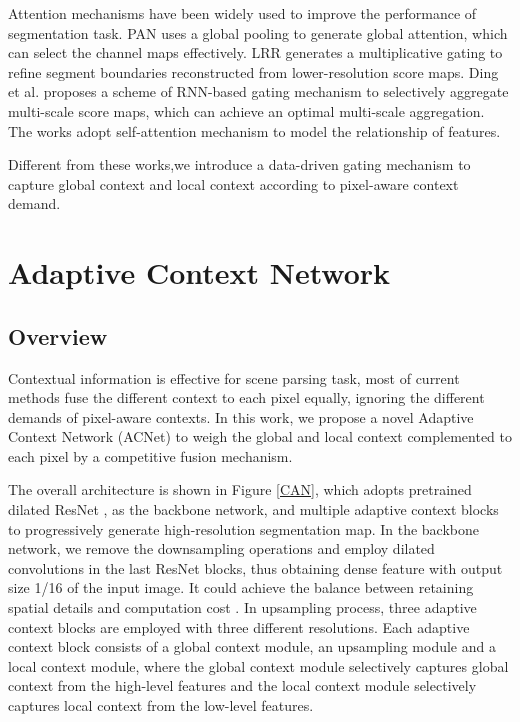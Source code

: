 \documentclass[10pt,twocolumn,letterpaper]{article}
\begin{document}
 Attention mechanisms have been widely used to  improve the performance of segmentation task. PAN \cite{li2018pyramid} uses a global pooling to generate global attention, which can select the channel maps effectively. LRR \cite{ghiasi2016laplacian}  generates a multiplicative gating to refine segment boundaries reconstructed from lower-resolution score maps.  Ding et al.\cite{ding2018context}  proposes a scheme of RNN-based gating mechanism  to selectively aggregate multi-scale score maps, which can achieve an optimal multi-scale aggregation. The works \cite{fu2018dual,yuan2018ocnet,huang2018ccnet} adopt self-attention mechanism to model the relationship of features.



Different from these works,we introduce a data-driven gating mechanism to capture global context and local context according to pixel-aware context demand.



\section{Adaptive Context Network}


\subsection{Overview}
Contextual information is effective for scene parsing task, most of current methods  fuse the different context  to each pixel equally, ignoring the different demands of  pixel-aware contexts.
In this work, we propose a novel Adaptive Context Network (ACNet) to weigh the global and local context complemented to each pixel by a competitive fusion mechanism.

The overall architecture is shown in Figure \ref{CAN}, which adopts pretrained dilated ResNet \cite{he2016deep}, as the backbone network, and  multiple adaptive context blocks to progressively generate high-resolution segmentation map.
In the backbone network, we  remove the  downsampling operations and employ dilated convolutions in the last ResNet blocks, thus obtaining  dense feature  with output size 1/16 of the input image. It could achieve the balance between retaining spatial details and  computation cost \cite{chen2018encoder}. 
In upsampling process, three adaptive context blocks are employed with three different resolutions.
Each adaptive context block consists of a global context module, an upsampling module and a  local context module, where the global context module selectively  captures global context from the high-level features and the local context module selectively  captures local context from the  low-level features.
\end{document}

